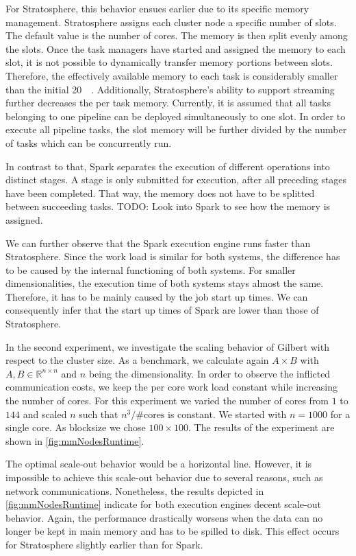 For Stratosphere, this behavior ensues earlier due to its specific memory management.
Stratosphere assigns each cluster node a specific number of slots.
The default value is the number of cores.
The memory is then split evenly among the slots.
Once the task managers have started and assigned the memory to each slot, it is not possible to dynamically transfer memory portions between slots.
Therefore, the effectively available memory to each task is considerably smaller than the initial \SI{20}{\giga\byte}.
Additionally, Stratosphere's ability to support streaming further decreases the per task memory.
Currently, it is assumed that all tasks belonging to one pipeline can be deployed simultaneously to one slot.
In order to execute all pipeline tasks, the slot memory will be further divided by the number of tasks which can be concurrently run.

In contrast to that, Spark separates the execution of different operations into distinct stages.
A stage is only submitted for execution, after all preceding stages have been completed.
That way, the memory does not have to be splitted between succeeding tasks.
TODO: Look into Spark to see how the memory is assigned.

We can further observe that the Spark execution engine runs faster than Stratosphere.
Since the work load is similar for both systems, the difference has to be caused by the internal functioning of both systems.
For smaller dimensionalities, the execution time of both systems stays almost the same.
Therefore, it has to be mainly caused by the job start up times.
We can consequently infer that the start up times of Spark are lower than those of Stratosphere.

In the second experiment, we investigate the scaling behavior of Gilbert with respect to the cluster size.
As a benchmark, we calculate again $A\times B$ with $A,B \in \mathbb{R}^{n\times n}$ and $n$ being the dimensionality.
In order to observe the inflicted communication costs, we keep the per core work load constant while increasing the number of cores.
For this experiment we varied the number of cores from $1$ to $144$ and scaled $n$ such that $n^3/\#\text{cores}$ is constant.
We started with $n=1000$ for a single core.
As blocksize we chose $100\times 100$.
The results of the experiment are shown in \cref{fig:mmNodesRuntime}.

The optimal scale-out behavior would be a horizontal line.
However, it is impossible to achieve this scale-out behavior due to several reasons, such as network communications.
Nonetheless, the results depicted in \cref{fig:mmNodesRuntime} indicate for both execution engines decent scale-out behavior.
Again, the performance drastically worsens when the data can no longer be kept in main memory and has to be spilled to disk.
This effect occurs for Stratosphere slightly earlier than for Spark.

